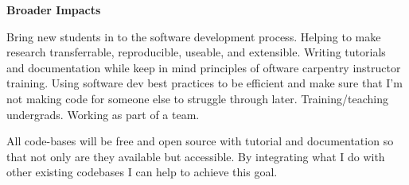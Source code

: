 \begin{center}
    \textbf{Broader Impacts}
\end{center}


Bring new students in to the software development process.
Helping to make research transferrable, reproducible, useable, and extensible. 
Writing tutorials and documentation while keep in mind principles of oftware carpentry instructor training. 
Using software dev best practices to be efficient and make sure that I'm not making code for someone else to struggle through later. 
Training/teaching undergrads.
Working as part of a team.

All code-bases will be free and open source with tutorial and documentation so that not only are they available but accessible.
By integrating what I do with other existing codebases I can help to achieve this goal.

